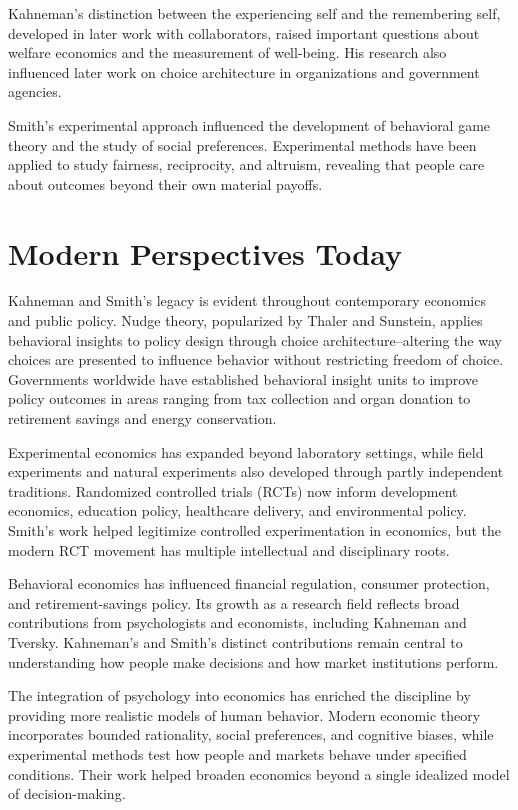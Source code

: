 Kahneman's distinction between the experiencing self and the remembering self,
developed in later work with collaborators, raised important questions about
welfare economics and the measurement of well-being. His research also influenced
later work on choice architecture in organizations and government agencies.

Smith's experimental approach influenced the development of behavioral
game theory and the study of social preferences. Experimental methods
have been applied to study fairness, reciprocity, and altruism, revealing
that people care about outcomes beyond their own material payoffs.

\section{Modern Perspectives Today}
Kahneman and Smith's legacy is evident throughout contemporary economics and
public policy. Nudge theory, popularized by Thaler and Sunstein, applies
behavioral insights to policy design through choice architecture--altering the
way choices are presented to influence behavior without restricting freedom of
choice. Governments worldwide have established behavioral insight units to
improve policy outcomes in areas ranging from tax collection and organ donation
to retirement savings and energy conservation.

Experimental economics has expanded beyond laboratory settings, while field
experiments and natural experiments also developed through partly independent
traditions. Randomized controlled trials (RCTs) now inform development economics,
education policy, healthcare delivery, and environmental policy. Smith's work
helped legitimize controlled experimentation in economics, but the modern RCT
movement has multiple intellectual and disciplinary roots.

Behavioral economics has influenced financial regulation, consumer protection,
and retirement-savings policy. Its growth as a research field reflects broad
contributions from psychologists and economists, including Kahneman and Tversky.
Kahneman's and Smith's distinct contributions remain central to understanding
how people make decisions and how market institutions perform.

The integration of psychology into economics has enriched the discipline by
providing more realistic models of human behavior. Modern economic theory
incorporates bounded rationality, social preferences, and cognitive biases,
while experimental methods test how people and markets behave under specified
conditions. Their work helped broaden economics beyond a single idealized model
of decision-making.

